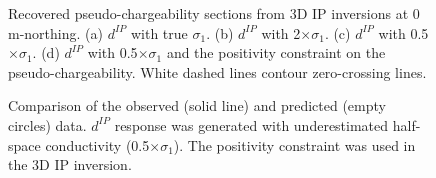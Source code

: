 \documentclass[extra,mreferee]{gji}
\newcommand{\dip}{d^{IP}}
\begin{document}
\begin{figure}
  \caption{Recovered pseudo-chargeability sections from 3D IP inversions at 0 m-northing. (a) $\dip$ with true $\sigma_1$. (b) $\dip$ with 2$\times \sigma_1$. (c) $\dip$ with 0.5$\times \sigma_1$. (d) $\dip$ with 0.5$\times \sigma_1$ and the positivity constraint on the pseudo-chargeability. White dashed lines contour zero-crossing lines.}
  \label{F:Regional_IPInv}
\end{figure}

\begin{figure}
  \caption{Comparison of the observed (solid line) and predicted (empty circles) data. $\dip$ response was generated with underestimated half-space conductivity (0.5$\times \sigma_1$). The positivity constraint was used in the 3D IP inversion.}
  \label{F:Reg_obspred}
\end{figure}
\end{document}
